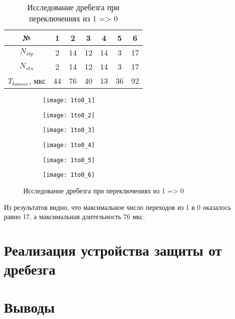 \begin{table}[H]
	\def\tabcolsep{20pt}
	\centering
	\caption{Исследование дребезга при переключениях из 1 => 0}
	\label{tab:1to0}
	\begin{tabular}{|c|c|c|c|c|c|c|}
		\hline
		№ & 1 & 2 & 3 & 4 & 5 & 6 \\ \hline
		$N_{stp}$ & 2 & 14 & 12 & 14 & 3 & 17 \\ \hline
		$N_{ctn}$ & 2 & 14 & 12 & 14 & 3 & 17 \\ \hline
		$T_{bounce}$, мкс & 44 & 76 & 40 & 13 & 36 & 92 \\ \hline
	\end{tabular}
\end{table}

\begin{figure}[H]
	\centering
	\begin{subfigure}[b]{\textwidth}
		\centering
		\texttt{[image: 1to0\_1]}
		\vspace{0.2cm}
	\end{subfigure}
	\begin{subfigure}[b]{\textwidth}
		\centering
		\texttt{[image: 1to0\_2]}
		\vspace{0.2cm}
	\end{subfigure}
	\begin{subfigure}[b]{\textwidth}
		\centering
		\texttt{[image: 1to0\_3]}
		\vspace{0.2cm}
	\end{subfigure}
	\begin{subfigure}[b]{\textwidth}
		\centering
		\texttt{[image: 1to0\_4]}
		\vspace{0.2cm}
	\end{subfigure}
	\begin{subfigure}[b]{\textwidth}
		\centering
		\texttt{[image: 1to0\_5]}
		\vspace{0.2cm}
	\end{subfigure}
	\begin{subfigure}[b]{\textwidth}
		\centering
		\texttt{[image: 1to0\_6]}
		\vspace{0.2cm}
	\end{subfigure}
	\caption{Исследование дребезга при переключениях из 1 => 0}
	\label{fig:1to0}
\end{figure}

Из результатов видно, что максимальное число переходов из 1 в 0 оказалось равно 17, а максимальная длительность 76 мкс.

\section{Реализация устройства защиты от дребезга}

\section{Выводы}

